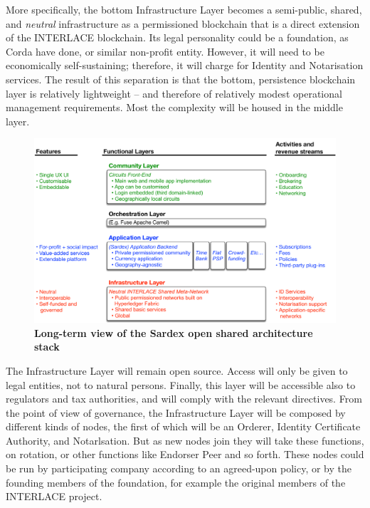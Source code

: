 More specifically, the bottom Infrastructure Layer becomes a semi-public, shared, and \emph{neutral} infrastructure as a permissioned blockchain that is a direct extension of the INTERLACE blockchain. Its legal personality could be a foundation, as Corda have done, or similar non-profit entity. However, it will need to be economically self-sustaining; therefore, it will charge for Identity and Notarisation services. The result of this separation is that the bottom, persistence blockchain layer is relatively lightweight -- and therefore of relatively modest operational management requirements. Most the complexity will be housed in the middle layer.

\begin{figure}[h]
\vspace{-0.3cm}
\centering
\includegraphics[width=16 cm]{Figures/Open_Shared_Architecture}
\vspace{0.1cm}
\caption{\bf \small Long-term view of the Sardex open shared architecture stack}
\label{fig:OpenArchitecture}
\end{figure}

The Infrastructure Layer will remain open source. Access will only be given to legal entities, not to natural persons. Finally, this layer will be accessible also to regulators and tax authorities, and will comply with the relevant directives. From the point of view of governance, the Infrastructure Layer will be composed by different kinds of nodes, the first of which will be an Orderer, Identity Certificate Authority, and Notarlsation. But as new nodes join they will take these functions, on rotation, or other functions like Endorser Peer and so forth. These nodes could be run by participating company according to an agreed-upon policy, or by the founding members of the foundation, for example the original members of the INTERLACE project.


